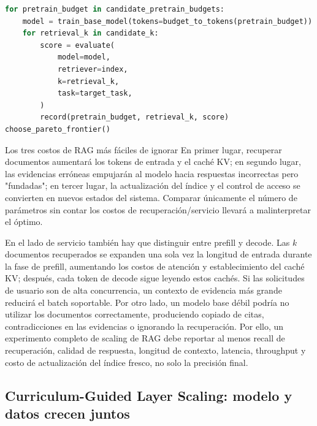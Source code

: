 \documentclass[a4paper]{article}
\begin{document}

\begin{lstlisting}[language=Python,caption={Pseudocódigo para explorar la asignación entre preentrenamiento y recuperación bajo presupuesto fijo}]
for pretrain_budget in candidate_pretrain_budgets:
    model = train_base_model(tokens=budget_to_tokens(pretrain_budget))
    for retrieval_k in candidate_k:
        score = evaluate(
            model=model,
            retriever=index,
            k=retrieval_k,
            task=target_task,
        )
        record(pretrain_budget, retrieval_k, score)
choose_pareto_frontier()
\end{lstlisting}

\begin{warningbox}{Los tres costos de RAG más fáciles de ignorar}
En primer lugar, recuperar documentos aumentará los tokens de entrada y el caché KV; en segundo lugar, las evidencias erróneas empujarán al modelo hacia respuestas incorrectas pero "fundadas"; en tercer lugar, la actualización del índice y el control de acceso se convierten en nuevos estados del sistema. Comparar únicamente el número de parámetros sin contar los costos de recuperación/servicio llevará a malinterpretar el óptimo.
\end{warningbox}

En el lado de servicio también hay que distinguir entre prefill y decode. Las $k$ documentos recuperados se expanden una sola vez la longitud de entrada durante la fase de prefill, aumentando los costos de atención y establecimiento del caché KV; después, cada token de decode sigue leyendo estos cachés. Si las solicitudes de usuario son de alta concurrencia, un contexto de evidencia más grande reducirá el batch soportable. Por otro lado, un modelo base débil podría no utilizar los documentos correctamente, produciendo copiado de citas, contradicciones en las evidencias o ignorando la recuperación. Por ello, un experimento completo de scaling de RAG debe reportar al menos recall de recuperación, calidad de respuesta, longitud de contexto, latencia, throughput y costo de actualización del índice fresco, no solo la precisión final.

\subsection{Curriculum-Guided Layer Scaling: modelo y datos crecen juntos}
\end{document}
